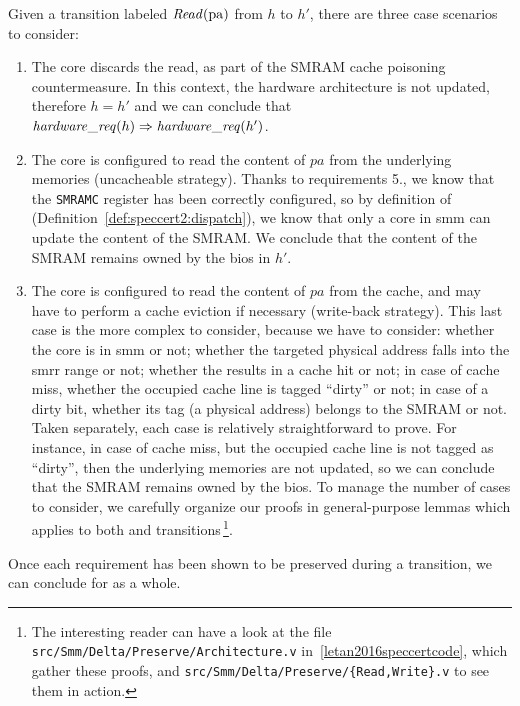 Given a transition labeled \( \mathit{Read}(\mathrm{pa}) \) from \( h \) to \( h' \),
there are three case scenarios to consider:
%
\begin{enumerate}
\item The core discards the read, as part of the SMRAM cache poisoning
  countermeasure.
  In this context, the hardware architecture is not updated, therefore
  \( h = h' \) and we can conclude that
  \( \mathit{hardware\_req}(h) \Rightarrow \mathit{hardware\_req}(h') \).
\item The core is configured to read the content of \( pa \) from the underlying
  memories (uncacheable strategy).
  Thanks to requirements 5., we know that the \texttt{SMRAMC} register has been
  correctly configured, so by definition of 
  (Definition~\ref{def:speccert2:dispatch}), we know that only a core in
  \ac{smm} can update the content of the SMRAM.
  We conclude that the content of the SMRAM remains owned by the \ac{bios} in
  \( h' \).
\item The core is configured to read the content of \( pa \) from the cache, and
  may have to perform a cache eviction if necessary (write-back strategy).
  This last case is the more complex to consider, because we have to consider:
  whether the core is in \ac{smm} or not;
  whether the targeted physical address falls into the \ac{smrr} range or not;
  whether the \IO results in a cache hit or not;
  in case of cache miss, whether the occupied cache line is tagged ``dirty'' or
  not;
  in case of a dirty bit, whether its tag (a physical address) belongs to the
  SMRAM or not.
  Taken separately, each case is relatively straightforward to prove.
  For instance, in case of cache miss, but the occupied cache line is not tagged
  as ``dirty'', then the underlying memories are not updated, so we can conclude
  that the SMRAM remains owned by the \ac{bios}.
  To manage the number of cases to consider, we carefully organize our proofs in
  general-purpose lemmas which applies to both  and 
  transitions\,\footnote{The interesting reader can have a look at the file
    \texttt{src/Smm/Delta/Preserve/Architecture.v}
    in~\ref{letan2016speccertcode}, which gather these proofs, and
    \texttt{src/Smm/Delta/Preserve/\{Read,Write\}.v} to see them in action.}.
\end{enumerate}
%
Once each requirement has been shown to be preserved during a transition, we can
conclude for  as a whole.

